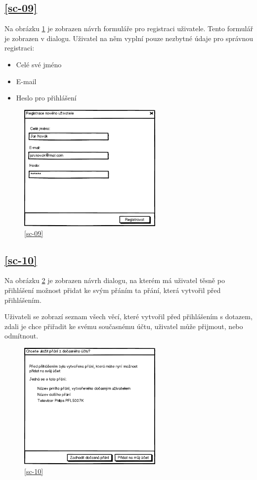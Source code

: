 \subsection{\ref{sc-09}}
Na obrázku \ref{fig:dialog-registrace} je zobrazen návrh formuláře pro registraci uživatele. Tento formulář je zobrazen v dialogu. Uživatel na něm vyplní pouze nezbytné údaje pro správnou registraci:
\begin{itemize}
\item Celé své jméno
\item E-mail
\item Heslo pro přihlášení
\end{itemize} 

\begin{figure}[htb]
\begin{center}
\includegraphics[width=70mm]{./pictures/mock/dialog-registrace.png}
\caption{\ref{sc-09}}
\label{fig:dialog-registrace}
\end{center}
\end{figure}

\subsection{\ref{sc-10}}
Na obrázku \ref{fig:dialog-pridani-docasnych-prani} je zobrazen návrh dialogu, na kterém má uživatel těsně po přihlášení možnost přidat ke svým přáním ta přání, která vytvořil před přihlášením.

Uživateli se zobrazí seznam všech věcí, které vytvořil před přihlášením s dotazem, zdali je chce přiřadit ke svému současnému účtu, uživatel může přijmout, nebo odmítnout.

\begin{figure}[htb]
\begin{center}
\includegraphics[width=70mm]{./pictures/mock/dialog-pridani-docasnych-prani.png}
\caption{\ref{sc-10}}
\label{fig:dialog-pridani-docasnych-prani}
\end{center}
\end{figure}